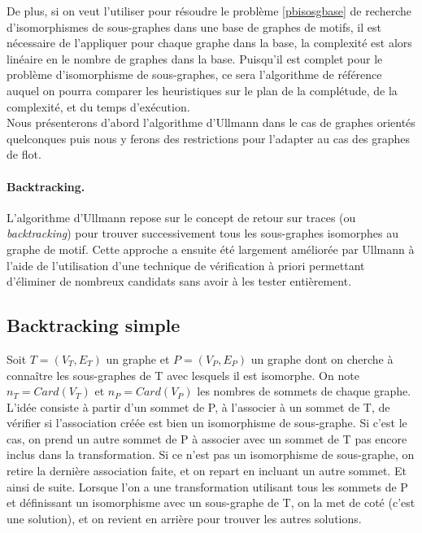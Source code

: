 De plus, si on veut l'utiliser pour résoudre le problème \ref{pbisosgbase} de recherche d'isomorphismes de sous-graphes dans une base de graphes de motifs, il est nécessaire de l'appliquer pour chaque graphe dans la base, la complexité est alors linéaire en le nombre de graphes dans la base.
Puisqu'il est complet pour le problème d'isomorphisme de sous-graphes, ce sera l'algorithme de référence auquel on pourra comparer les heuristiques sur le plan de la complétude, de la complexité, et du temps d'exécution.\\

Nous présenterons d'abord l'algorithme d'Ullmann dans le cas de graphes orientés quelconques puis nous y ferons des restrictions pour l'adapter au cas des graphes de flot.

\paragraph{Backtracking.}
L'algorithme d'Ullmann repose sur le concept de retour sur traces (ou \emph{backtracking}) pour trouver successivement tous les sous-graphes isomorphes au graphe de motif. 
Cette approche a ensuite été largement améliorée par Ullmann à l'aide de l'utilisation d'une technique de vérification à priori permettant d'éliminer de nombreux candidats sans avoir à les tester entièrement.

\subsection{Backtracking simple}
Soit $T=(V_T, E_T)$ un graphe et $P=(V_P, E_P)$ un graphe dont on cherche à connaître les sous-graphes de T avec lesquels il est isomorphe.
On note $n_T=Card(V_T)$ et $n_P=Card(V_P)$ les nombres de sommets de chaque graphe.
L'idée consiste à partir d'un sommet de P, à l'associer à un sommet de T, de vérifier si l'association créée est bien un
isomorphisme de sous-graphe. 
Si c'est le cas, on prend un autre sommet de P à associer avec un sommet de T pas encore
inclus dans la transformation. 
Si ce n'est pas un isomorphisme de sous-graphe, on retire la dernière association faite, et on repart en incluant un autre sommet. 
Et ainsi de suite. Lorsque l'on a une transformation utilisant tous les sommets de P et définissant un isomorphisme avec un sous-graphe de T, on la met de coté (c'est une solution), et on revient en arrière pour trouver les autres solutions.


